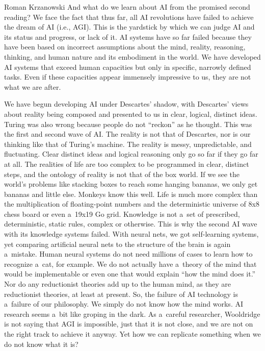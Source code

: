 \begin{newrevengenv}{Roman Krzanowski}
And what do we learn about AI from the promised second reading? We face the fact that thus far, all AI revolutions have failed to achieve the dream of AI (i.e., AGI). This is the yardstick by which we can judge AI and its status and progress, or lack of it. AI systems have so far failed because they have been based on incorrect assumptions about the mind, reality, reasoning, thinking, and human nature and its embodiment in the world. We have developed AI systems that exceed human capacities but only in specific, narrowly defined tasks. Even if these capacities appear immensely impressive to us, they are not what we are after.

We have begun developing AI under Descartes’ shadow, with Descartes’ views about reality being composed and presented to us in clear, logical, distinct ideas. Turing was also wrong because people do not ``reckon'' as he thought. This was the first and second wave of AI. The reality is not that of Descartes, nor is our thinking like that of Turing’s machine. The reality is messy, unpredictable, and fluctuating. Clear distinct ideas and logical reasoning only go so far if they go far at all. The realities of life are too complex to be programmed in clear, distinct steps, and the ontology of reality is not that of the box world. If we see the world’s problems like stacking boxes to reach some hanging bananas, we only get bananas and little else. Monkeys know this well. Life is much more complex than the multiplication of floating-point numbers and the deterministic universe of 8x8 chess board or even a~19x19 Go grid. Knowledge is not a~set of prescribed, deterministic, static rules, complex or otherwise. This is why the second AI wave with its knowledge systems failed. With neural nets, we got self-learning systems, yet comparing artificial neural nets to the structure of the brain is again a~mistake. Human neural systems do not need millions of cases to learn how to recognize a~cat, for example. We do not actually have a~theory of the mind that would be implementable or even one that would explain ``how the mind does it.'' Nor do any reductionist theories add up to the human mind, as they are reductionist theories, at least at present. So, the failure of AI technology is a~failure of our philosophy. We simply do not know how the mind works. AI research seems a~bit like groping in the dark. As a~careful researcher, Wooldridge is not saying that AGI is impossible, just that it is not close, and we are not on the right track to achieve it anyway. Yet how we can replicate something when we do not know what it is?


\end{newrevengenv}
